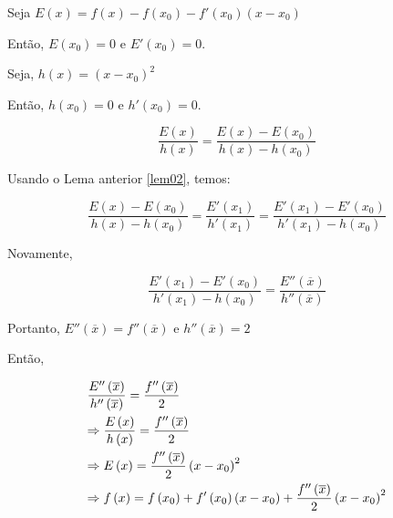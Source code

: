 \documentclass{book}
\begin{document}
\begin{dem}
Seja $E\left( x \right) = f\left( x \right) - f\left( {x_0 } \right) - f'\left( {x_0 } \right)\left( {x - x_0 } \right)$

Ent\~ao, $E\left( {x_0 } \right) = 0$ e $E'\left( {x_0 } \right) = 0$.

Seja, $h\left( x \right) = \left( {x - x_0 } \right)^2$

Ent\~ao, $h\left( {x_0 } \right) = 0$ e $h'\left( {x_0 } \right) = 0$.

\[
\frac{{E\left( x \right)}}
{{h\left( x \right)}} = \frac{{E\left( x \right) - E\left( {x_0 } \right)}}
{{h\left( x \right) - h\left( {x_0 } \right)}}
\]

Usando o Lema anterior \ref{lem02}, temos:

\[
\frac{{E\left( x \right) - E\left( {x_0 } \right)}}
{{h\left( x \right) - h\left( {x_0 } \right)}} = \frac{{E'\left( {x_1 } \right)}}
{{h'\left( {x_1 } \right)}} = \frac{{E'\left( {x_1 } \right) - E'\left( {x_0 } \right)}}
{{h'\left( {x_1 } \right) - h\left( {x_0 } \right)}}
\]

Novamente,

\[
\frac{{E'\left( {x_1 } \right) - E'\left( {x_0 } \right)}}
{{h'\left( {x_1 } \right) - h\left( {x_0 } \right)}} = \frac{{E''\left( {\overline x } \right)}}
{{h''\left( {\overline x } \right)}}
\]

Portanto, $E''\left( {\overline x } \right) = f''\left( {\overline x } \right)$ e $h''\left( {\overline x } \right) = 2$

Ent\~ao,

\[
\begin{gathered}
\frac{{E''\left( {\overline x } \right)}}
{{h''\left( {\overline x } \right)}} = \frac{{f''\left( {\overline x } \right)}}
{2} \hfill \\
\Rightarrow \frac{{E\left( x \right)}}
{{h\left( x \right)}} = \frac{{f''\left( {\overline x } \right)}}
{2} \hfill \\
\Rightarrow E\left( x \right) = \frac{{f''\left( {\overline x } \right)}}
{2}\left( {x - x_0 } \right)^2  \hfill \\
   \Rightarrow f\left( x \right) = f\left( {x_0 } \right) + f'\left( {x_0 } \right)\left( {x - x_0 } \right) + \frac{{f''\left( {\overline x } \right)}}
{2}\left( {x - x_0 } \right)^2  \hfill \\
\end{gathered}
\]

\end{dem}
\end{document}
